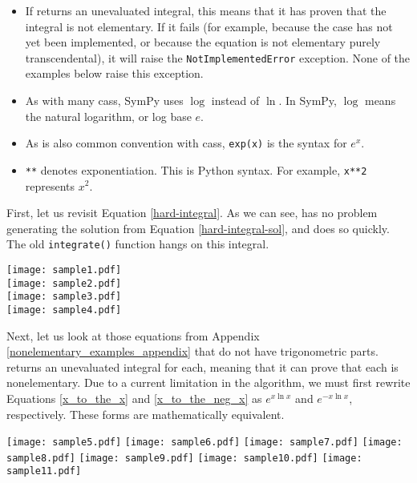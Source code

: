 \begin{itemize}
\item If \rischintegrate{} returns an unevaluated integral, this means
that it has proven that the integral is not \gls{elementary}.  If it
fails (for example, because the case has not yet been implemented, or
because the equation is not \gls{elementary} purely
\gls{transcendental}), it will raise the \texttt{NotImplementedError}
exception.  None of the examples below raise this exception.

\item As with many \glspl{cas}, SymPy uses $\log$ instead of $\ln$. 
In SymPy, $\log$ means the natural logarithm, or log base $e$.

\item As is also common convention with \glspl{cas}, \texttt{exp(x)} is
the syntax for $e^x$.

\item \texttt{**} denotes exponentiation.  This is Python syntax.  For
example, \texttt{x**2} represents $x^2$.
\end{itemize}

First, let us revisit Equation \ref{hard-integral}.  As we can see,
\rischintegrate{} has no problem generating the solution from Equation
\ref{hard-integral-sol}, and does so quickly.  The old
\texttt{integrate()} function hangs on this integral.

\begin{flushleft}
\texttt{[image: sample1.pdf]}\\
\texttt{[image: sample2.pdf]}\\
\texttt{[image: sample3.pdf]}\\
\texttt{[image: sample4.pdf]}
\end{flushleft}

Next, let us look at those equations from Appendix
\ref{nonelementary_examples_appendix} that do not have
trigonometric parts.  \rischintegrate{} returns an unevaluated integral for
each, meaning that it can prove that each is nonelementary.  Due to a
current limitation in the algorithm, we must first rewrite Equations
\ref{x_to_the_x} and \ref{x_to_the_neg_x} as $e^{x\ln{x}}$ and
$e^{-x\ln{x}}$, respectively.  These forms are mathematically equivalent.

\begin{flushleft}
\texttt{[image: sample5.pdf]}
\texttt{[image: sample6.pdf]}
\texttt{[image: sample7.pdf]}
\texttt{[image: sample8.pdf]}
\texttt{[image: sample9.pdf]}
\texttt{[image: sample10.pdf]}
\texttt{[image: sample11.pdf]}
\end{flushleft}

